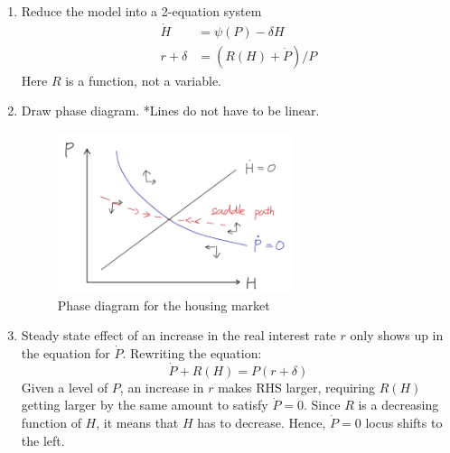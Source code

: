 \documentclass[11pt]{amsart}
\begin{document}
\begin{enumerate}[label=(\alph*)]
\item Reduce the model into a 2-equation system
\begin{align*}
\dot{H} &= \psi(P) - \delta H \\
r + \delta &= (R(H) + \dot{P}) / P
\end{align*}
Here $R$ is a function, not a variable. 
\item Draw phase diagram. 
*Lines do not have to be linear. 
\begin{figure}[H]
	\centering
	\includegraphics[width=0.65\textwidth]{1c_Minki.png}
	\caption{Phase diagram for the housing market}
\end{figure}
\item Steady state effect of an increase in the real interest rate
$r$ only shows up in the equation for $\dot{P}$. Rewriting the equation: 
\begin{equation*}
\dot{P} + R(H) = P (r + \delta)
\end{equation*}
Given a level of $P$, an increase in $r$ makes RHS larger, requiring $R(H)$ getting larger by the same amount to satisfy $\dot{P} = 0$. Since $R$ is a decreasing function of $H$, it means that $H$ has to decrease. Hence, $\dot{P} = 0$ locus shifts to the left. 


\end{enumerate}
\end{document}
